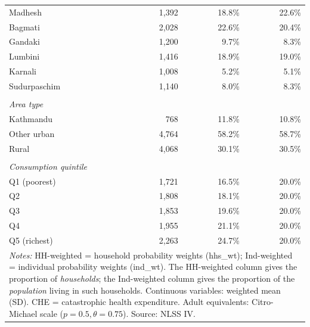 \begin{table}[htbp]
\begin{tabular}{lrrr}
\quad Madhesh & 1,392 & 18.8\% & 22.6\% \\
\quad Bagmati & 2,028 & 22.6\% & 20.4\% \\
\quad Gandaki & 1,200 & 9.7\% & 8.3\% \\
\quad Lumbini & 1,416 & 18.9\% & 19.0\% \\
\quad Karnali & 1,008 & 5.2\% & 5.1\% \\
\quad Sudurpaschim & 1,140 & 8.0\% & 8.3\% \\
\\
\multicolumn{4}{l}{\textit{Area type}} \\
\quad Kathmandu & 768 & 11.8\% & 10.8\% \\
\quad Other urban & 4,764 & 58.2\% & 58.7\% \\
\quad Rural & 4,068 & 30.1\% & 30.5\% \\
\\
\multicolumn{4}{l}{\textit{Consumption quintile}} \\
\quad Q1 (poorest) & 1,721 & 16.5\% & 20.0\% \\
\quad Q2 & 1,808 & 18.1\% & 20.0\% \\
\quad Q3 & 1,853 & 19.6\% & 20.0\% \\
\quad Q4 & 1,955 & 21.1\% & 20.0\% \\
\quad Q5 (richest) & 2,263 & 24.7\% & 20.0\% \\
\hline\hline
\multicolumn{4}{p{13cm}}{\footnotesize \textit{Notes:} HH-weighted = household probability weights (hhs\_wt); Ind-weighted = individual probability weights (ind\_wt). The HH-weighted column gives the proportion of \textit{households}; the Ind-weighted column gives the proportion of the \textit{population} living in such households. Continuous variables: weighted mean (SD). CHE = catastrophic health expenditure. Adult equivalents: Citro-Michael scale ($p=0.5, \theta=0.75$). Source: NLSS IV.} \\
\end{tabular}
\end{table}